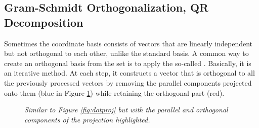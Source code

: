 \subsection{Gram-Schmidt Orthogonalization, QR Decomposition}
\label{section:GSortho}
Sometimes the coordinate basis consists of vectors that are linearly independent but not orthogonal to each other, unlike the standard basis. A common way to create an orthogonal basis from the set is to apply the so-called . Basically, it is an iterative method. At each step, it constructs a vector that is orthogonal to all the previously processed vectors by removing the parallel components projected onto them (blue in Figure \ref{fig:7.3}) while retaining the orthogonal part (red).
\begin{figure}
\centering
{}
\caption{\textit{Similar to Figure \ref{fig:dotproj} but with the parallel and orthogonal components of the projection highlighted.}}
\label{fig:7.3}
\end{figure}
